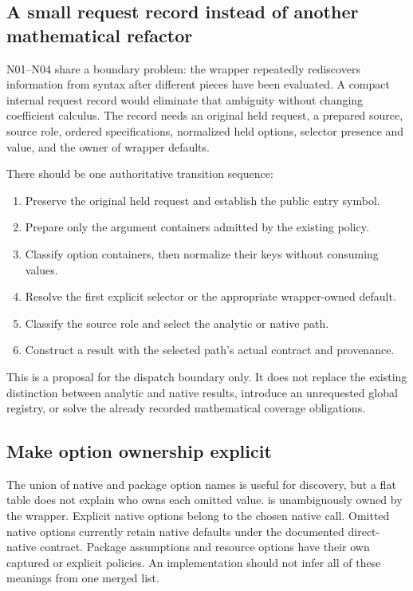 \documentclass[11pt,letterpaper]{article}
\newcommand{\code}[1]{\texttt{\detokenize{#1}}}
\begin{document}
\subsection{A small request record instead of another mathematical refactor}

N01--N04 share a boundary problem: the wrapper repeatedly rediscovers
information from syntax after different pieces have been evaluated. A compact
internal request record would eliminate that ambiguity without changing
coefficient calculus. The record needs an original held request, a prepared
source, source role, ordered specifications, normalized held options,
selector presence and value, and the owner of wrapper defaults.

There should be one authoritative transition sequence:
\begin{enumerate}
\item Preserve the original held request and establish the public entry symbol.
\item Prepare only the argument containers admitted by the existing policy.
\item Classify option containers, then normalize their keys without consuming values.
\item Resolve the first explicit selector or the appropriate wrapper-owned default.
\item Classify the source role and select the analytic or native path.
\item Construct a result with the selected path's actual contract and provenance.
\end{enumerate}
This is a proposal for the dispatch boundary only. It does not replace the
existing distinction between analytic and native results, introduce an
unrequested global registry, or solve the already recorded mathematical
coverage obligations.

\subsection{Make option ownership explicit}

The union of native and package option names is useful for discovery, but a
flat \code{Options} table does not explain who owns each omitted value.
\code{"Backend"} is unambiguously owned by the wrapper. Explicit native
options belong to the chosen native call. Omitted native options currently
retain native defaults under the documented direct-native contract. Package
assumptions and resource options have their own captured or explicit policies.
An implementation should not infer all of these meanings from one merged list.
\end{document}
